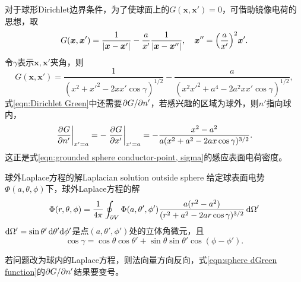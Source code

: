 对于球形Dirichlet边界条件，为了使球面上的$G(\bm x,\bm x')=0$，可借助镜像电荷的思想，取
\begin{equation}
    \label{eqn:sphere Green function}
    G(\bm x,\bm x')=\frac1{|\bm x-\bm x'|}-\frac a{x'}\frac1{|\bm x-\bm x''|},\quad\bm x''=\Bigl(\frac{a}{x'}\Bigr)^2\bm x'.
\end{equation}
令$\gamma$表示$\bm x,\bm x'$夹角，则
\[
    G(\bm x,\bm x')=\frac1{(x^2+x'^2-2xx'\cos\gamma)^{1/2}}-\frac a{(x^2x'^2+a^4-2a^2xx'\cos\gamma)^{1/2}},
\]
式\eqref{eqn:Dirichlet Green}中还需要$\partial G/\partial n'$，若感兴趣的区域为球外，则$n'$指向球内，
\begin{equation}
    \label{eqn:sphere dGreen function}
    \left.\frac{\partial^{{}}G}{\partial{n'}^{{}}}\right\rvert_{x'=a}=-\left.\frac{\partial^{{}}G}{\partial{x'}^{{}}}\right\rvert_{x'=a}=-\frac{x^2-a^2}{a(x^2+a^2-2ax\cos\gamma)^{3/2}}.
\end{equation}
这正是式\eqref{eqn:grounded sphere conductor-point, sigma}的感应表面电荷密度。

\begin{theorem}
    {球外Laplace方程的解}{Laplacian solution outside sphere}
    给定球表面电势$\Phi(a,\theta,\phi)$下，球外Laplace方程的解
    \begin{equation}
        \label{eqn:sphere Laplace solution}
        \Phi(r,\theta,\phi)=\frac1{4\pi}\oint_{\partial V}\Phi(a,\theta',\phi')\frac{a(r^2-a^2)}{(r^2+a^2-2ar\cos\gamma)^{3/2}}\mathop{}\!\mathrm{d}\Omega'
    \end{equation}
    $\mathop{}\!\mathrm{d}\Omega'=\sin\theta'\mathop{}\!\mathrm{d}\theta'\mathrm{d}\phi'$是点$(a,\theta',\phi')$处的立体角微元，且
    \[
        \cos\gamma=\cos\theta\cos\theta'+\sin\theta\sin\theta'\cos(\phi-\phi').
    \]
\end{theorem}
\begin{remark}
    若问题改为球内的Laplace方程，则法向量方向反向，式\eqref{eqn:sphere dGreen function}的$\partial G/\partial n'$结果要变号。
\end{remark}

